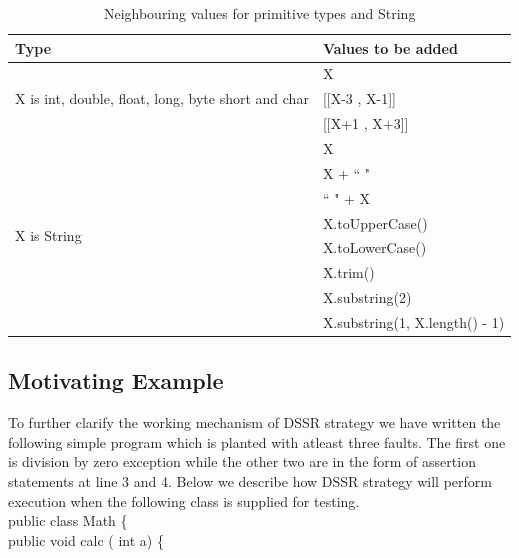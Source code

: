 \documentclass[10pt, conference, compsocconf]{IEEEtran}
\begin{document}
\begin{table}[ht]
\scriptsize
\caption{Neighbouring values for primitive types and String} %
\centering %
\begin{tabular}{| l | l |} %
\hline\hline %
Type & Values to be added\\ [0.5ex] %
\hline %
\multirow{3}{*}{X is int, double, float, long, byte short and char} & X \\ %

&[[X-3 , X-1]] \\
&[[X+1 , X+3]]\\
\hline
\multirow{8}{*}{X is String} & X\\ %

& X + ``  "\\ %
& ``  " + X \\ %
& X.toUpperCase() \\
& X.toLowerCase() \\
& X.trim() \\
& X.substring(2) \\
& X.substring(1, X.length() - 1) \\[1ex]
\hline
\hline %
\end{tabular}
\label{table:addvalues} %
\end{table}


\subsection{Motivating Example}
To further clarify the working mechanism of DSSR strategy we have written the following simple program which is planted with atleast three faults. The first one is division by zero exception while the other two are in the form of assertion statements at line 3 and 4.  Below we describe how DSSR strategy will perform execution when the following class is supplied for testing.\\



public class Math \{\\

\hspace{7mm} public void calc ( int a) \{\\
\end{document}
